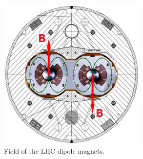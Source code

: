 		\begin{figure}[!ht]
		\centering
		\includegraphics[width=.45\textwidth,keepaspectratio=true]{chapters/chapter3_experiment/images/dipole-field.jpeg}
		\caption{Field of the \gls{LHC} dipole magnets. \cite{dipole-field}}
		\label{fig:dipole-field}
		\end{figure}

